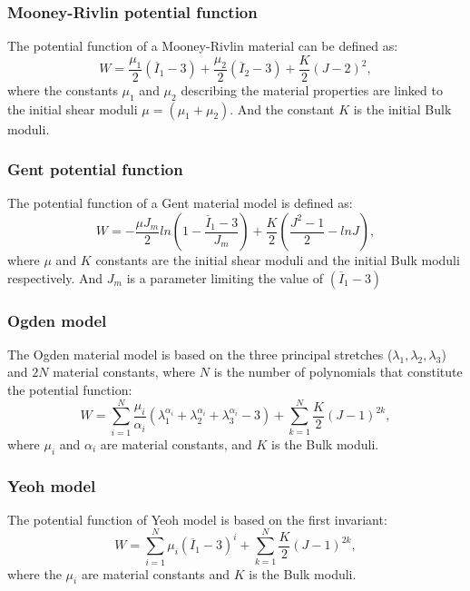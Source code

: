\subsubsection*{Mooney-Rivlin potential function}
The potential function of a Mooney-Rivlin \citep{rivlin_large_1951} material can be defined as:
\begin{equation}
\label{eq:mooneyRivlingmodel}
W=\frac{\mu_1}{2}(\overline{I}_1-3)+\frac{\mu_2}{2}(\overline{I}_2-3)+\frac{K}{2}(J-2)^2,
\end{equation}
where the constants $\mu_1$ and $\mu_2$ describing the material properties are linked to the initial shear moduli $\mu = (\mu_1+\mu_2)$. And the constant $K$ is the initial Bulk moduli. 

\subsubsection*{Gent potential function}
The potential function of a Gent \citep{gent_forms_1958} material model is defined as:
\begin{equation}
\label{gentmodel}
W=-\frac{\mu J_m}{2}ln\left(1-\frac{\overline{I}_1-3}{J_m}\right)+\frac{K}{2}\left(\frac{J^2-1}{2}-lnJ\right),
\end{equation}
 where $\mu$ and $K$ constants are the initial shear moduli and the initial Bulk moduli respectively. And $J_m$ is a parameter limiting the value of $(\overline{I}_1-3)$
\subsubsection*{Ogden model}
The Ogden \citep{ogden_large_1972} material model is based on the three principal stretches ($\lambda_1,\lambda_2,\lambda_3$) and $2N$ material constants, where $N$ is the number of polynomials that constitute the potential function:
\begin{equation}
\label{eq:ogdenmodel}
W= \sum^N_{i = 1} \frac{\mu_i}{\alpha_i}(\lambda_1^{\alpha_i}+\lambda_2^{\alpha_i}+\lambda_3^{\alpha_i}-3) + \sum_{k=1}^N \frac{K}{2}(J-1)^{2k},
\end{equation}
where $\mu_i$ and $\alpha_i$ are material constants, and $K$ is the Bulk moduli.

\subsubsection*{Yeoh model}
The potential function of Yeoh \citep{yeoh_characterization_1990} model is based on the first invariant:
\begin{equation}
\label{eq:yeohmodel}
W = \sum_{i=1}^N \mu_i(\overline{I}_1 - 3)^i + \sum_{k=1}^N \frac{K}{2}(J-1)^{2k},
\end{equation}
where the $\mu_i$ are material constants and $K$ is the Bulk moduli.

